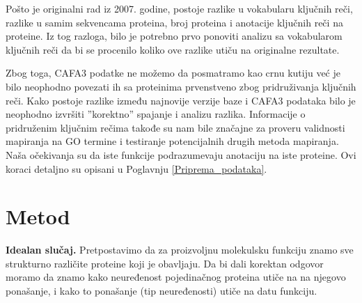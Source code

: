 Pošto je originalni rad iz 2007. godine, postoje razlike u
vokabularu ključnih reči, razlike u samim sekvencama proteina, broj proteina i
anotacije ključnih reči na proteine.  Iz tog razloga, bilo je potrebno
prvo ponoviti analizu sa vokabularom ključnih reči da bi se procenilo koliko
ove razlike utiču na originalne rezultate.

Zbog toga, CAFA3 podatke ne možemo da posmatramo kao crnu kutiju već je
bilo neophodno povezati ih sa \swissprot proteinima prvenstveno zbog
pridruživanja ključnih reči. Kako postoje razlike između najnovije verzije \swissprot
baze i CAFA3 podataka bilo je neophodno izvršiti ''korektno'' spajanje i
analizu razlika.  Informacije o pridruženim ključnim rečima takođe su nam bile
značajne za proveru validnosti mapiranja na GO termine i testiranje
potencijalnih drugih metoda mapiranja. Naša očekivanja su da iste funkcije
podrazumevaju anotaciju na iste proteine.  Ovi koraci detaljno su opisani u
Poglavnju \ref{Priprema_podataka}.



\section {Metod}


\textbf{Idealan slučaj.} 
Pretpostavimo da za proizvoljnu molekulsku funkciju znamo sve strukturno različite
proteine koji je obavljaju.  Da bi dali korektan odgovor  moramo da znamo kako
neuređenost pojedinačnog proteina utiče na
na njegovo ponašanje, i kako to ponašanje (tip neuređenosti) utiče na datu funkciju.

